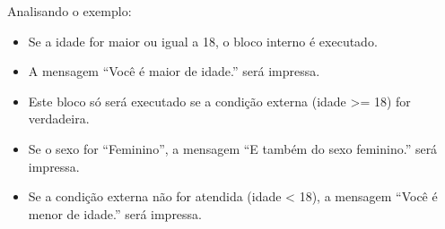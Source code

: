 \documentclass[letterpaper,10pt,english]{jupyterBook}
\begin{document}
\begin{sphinxVerbatim}[commandchars=\\\{\}]
  
  

   
    
       
\end{sphinxVerbatim}

\sphinxAtStartPar
Analisando o exemplo:

\sphinxAtStartPar
{}
\begin{itemize}
\item {} 
\sphinxAtStartPar
Se a idade for maior ou igual a 18, o bloco interno é executado.

\item {} 
\sphinxAtStartPar
A mensagem “Você é maior de idade.” será impressa.

\end{itemize}

\sphinxAtStartPar
{}
\begin{itemize}
\item {} 
\sphinxAtStartPar
Este bloco só será executado se a condição externa (idade >= 18) for verdadeira.

\item {} 
\sphinxAtStartPar
Se o sexo for “Feminino”, a mensagem “E também do sexo feminino.” será impressa.

\end{itemize}

\sphinxAtStartPar
{}
\begin{itemize}
\item {} 
\sphinxAtStartPar
Se a condição externa não for atendida (idade < 18), a mensagem “Você é menor de idade.” será impressa.

\end{itemize}
\end{document}
